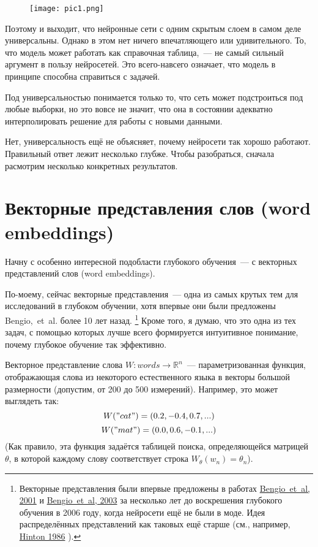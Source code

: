 \documentclass[a4paper,12pt]{article}
\begin{document}
\begin{figure}[t]
\begin{center}
\texttt{[image: pic1.png]}
\end{center}
\end{figure}

Поэтому и выходит, что нейронные сети с одним скрытым слоем в самом деле универсальны. Однако в этом нет ничего впечатляющего или удивительного. То, что модель может работать как справочная таблица,~--- не самый сильный аргумент в пользу нейросетей. Это всего-навсего означает, что модель в принципе способна справиться с задачей.

Под универсальностью понимается только то, что сеть может подстроиться под любые выборки, но это вовсе не значит, что она в состоянии адекватно интерполировать решение для работы с новыми данными.

Нет, универсальность ещё не объясняет, почему нейросети так хорошо работают. Правильный ответ лежит несколько глубже. Чтобы разобраться, сначала расмотрим несколько конкретных результатов.

\section*{ Векторные представления слов (word embeddings) }

Начну с особенно интересной подобласти глубокого обучения~--- с векторных представлений слов (word embeddings). 

По-моему, сейчас векторные представления~--- одна из самых крутых тем для исследований в глубоком обучении, хотя впервые они были предложены Bengio,~et~al. более 10 лет назад. \footnote{Векторные представления были впервые предложены в работах \href{http://www.iro.umontreal.ca/~lisa/publications2/index.php/publications/show/64}{Bengio~et~al, 2001} и \href{http://machinelearning.wustl.edu/mlpapers/paper_files/BengioDVJ03.pdf}{Bengio~et~al, 2003} за несколько лет до воскрешения глубокого обучения в 2006 году, когда нейросети ещё не были в моде. Идея распределённых представлений как таковых ещё старше (см., например, \href{http://www.cogsci.ucsd.edu/~ajyu/Teaching/Cogs202_sp13/Readings/hinton86.pdf}{Hinton 1986} ).} Кроме того, я думаю, что это одна из тех задач, с помощью которых лучше всего формируется интуитивное понимание, почему глубокое обучение так эффективно.

Векторное представление слова $W : words \rightarrow \mathds{R}^n$~--- параметризованная функция, отображающая слова из некоторого естественного языка в векторы большой размерности (допустим, от 200 до 500 измерений). Например, это может выглядеть так:
$$W("cat")=(0.2, -0.4, 0.7, ...)$$
$$W("mat")=(0.0, 0.6, -0.1, ...)$$
(Как правило, эта функция задаётся таблицей поиска, определяющейся матрицей $\theta$, в которой каждому слову соответствует строка $W_{\theta}(w_n)=\theta_n$).
\end{document}
